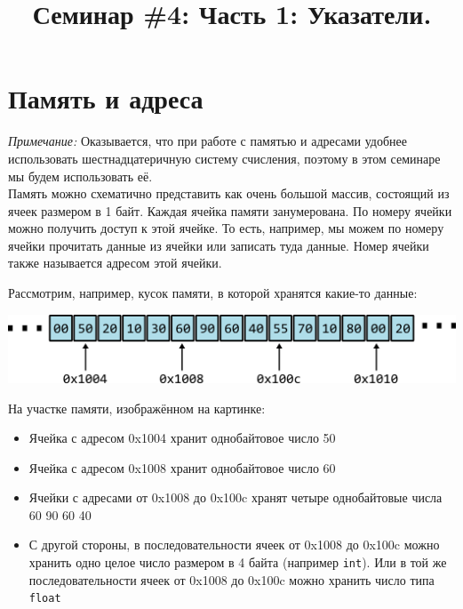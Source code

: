 \documentclass[10pt]{article}
\begin{document}
\title{Семинар \#4: Часть 1: Указатели. \vspace{-5ex}}\date{}\maketitle
\section*{Память и адреса}

\textit{Примечание:} Оказывается, что при работе с памятью и адресами удобнее использовать шестнадцатеричную систему счисления, поэтому в этом семинаре мы будем использовать её.\\

Память можно схематично представить как очень большой массив, состоящий из ячеек размером в 1 байт.
Каждая ячейка памяти занумерована. По номеру ячейки можно получить доступ к этой ячейке.
То есть, например, мы можем по номеру ячейки прочитать данные из ячейки или записать туда данные.
Номер ячейки также называется адресом этой ячейки.

Рассмотрим, например, кусок памяти, в которой хранятся какие-то данные:

\begin{center}
\includegraphics[scale=1]{../images/memory1.png}
\end{center}

 
На участке памяти, изображённом на картинке:

\begin{itemize}
\item Ячейка с адресом 0x1004 хранит однобайтовое число 50
\item Ячейка с адресом 0x1008 хранит однобайтовое число 60
\item Ячейки с адресами от 0x1008 до 0x100c хранят четыре однобайтовые числа  60 90 60 40
\item С другой стороны, в последовательности ячеек от 0x1008 до 0x100c можно хранить одно целое число размером в 4 байта (например \texttt{int}). Или в той же последовательности ячеек от 0x1008 до 0x100c можно хранить число типа \texttt{float}
\end{itemize}
\end{document}
